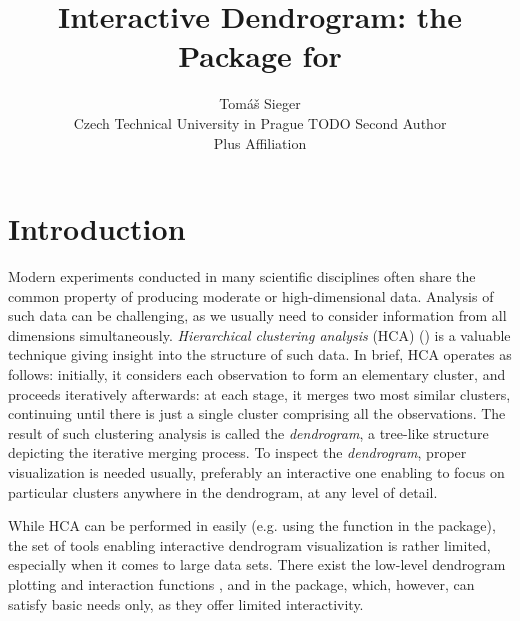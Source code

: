 \documentclass[article]{jss}
\author{Tom\'a\v{s} Sieger\\Czech Technical University in Prague \And 
        TODO Second Author\\Plus Affiliation}
\title{Interactive Dendrogram: the \pkg{idendro} Package for \proglang{R}}
\newcommand{\myemph}[1]{\emph{#1}}
\newcommand{\Rfunction}[1]{\code{#1}}
\begin{document}


\section[Introduction]{Introduction}

Modern experiments conducted in many scientific disciplines
often share the common property of producing moderate or
high-dimensional data.
Analysis of such data can be challenging, as we usually need to
consider information from all dimensions simultaneously.
\myemph{Hierarchical clustering analysis} (HCA) (\cite{ESL}) is a
valuable technique giving insight into the structure of such data.
In brief, HCA operates as follows: initially, it considers each
observation to form an elementary cluster, and proceeds iteratively
afterwards: at each stage, it merges two most similar clusters, 
continuing until there is just a single cluster comprising all the
observations. 
The result of such clustering analysis is called the
\myemph{dendrogram}, a tree-like structure depicting the iterative
merging process. To inspect the \myemph{dendrogram}, proper
visualization is needed usually, preferably an interactive one enabling
to focus on particular clusters anywhere in the dendrogram, at any
level of detail.

While HCA can be performed in  easily (e.g. using the
\Rfunction{hclust} function in the  package), the set of tools
enabling interactive dendrogram visualization is rather limited,
especially when it comes to large data sets.
There exist the low-level dendrogram plotting and interaction
functions ,  and
 in the  package, which, however, can
satisfy basic needs only, as they offer limited interactivity.

\end{document}
